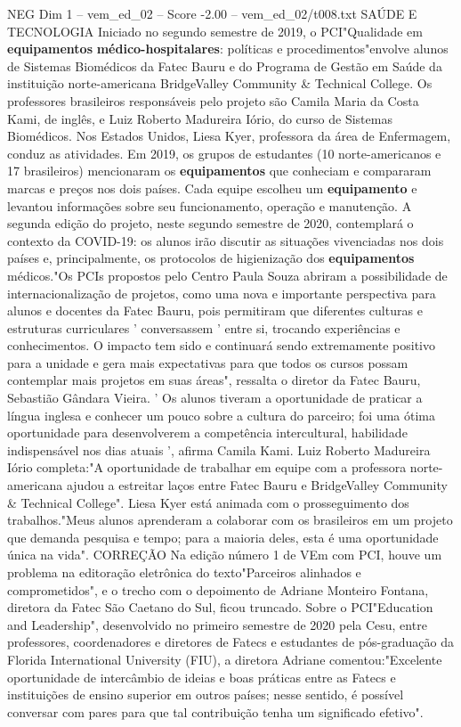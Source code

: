 \begin{textsample}{NEG Dim 1 – vem\_ed\_02 – Score -2.00 – vem\_ed\_02/t008.txt}  \label{ex:f1_neg_015}
SAÚDE E TECNOLOGIA Iniciado no segundo semestre de 2019, o PCI"Qualidade em \textbf{equipamentos} \textbf{médico-hospitalares}: políticas e procedimentos"envolve alunos de Sistemas Biomédicos da Fatec Bauru e do Programa de Gestão em Saúde da instituição norte-americana BridgeValley Community \& Technical College.
Os professores brasileiros responsáveis pelo projeto são Camila Maria da Costa Kami, de inglês, e Luiz Roberto Madureira Iório, do curso de Sistemas Biomédicos.
Nos Estados Unidos, Liesa Kyer, professora da área de Enfermagem, conduz as atividades.
Em 2019, os grupos de estudantes (10 norte-americanos e 17 brasileiros) mencionaram os \textbf{equipamentos} que conheciam e compararam marcas e preços nos dois países.
Cada equipe escolheu um \textbf{equipamento} e levantou informações sobre seu funcionamento, operação e manutenção.
A segunda edição do projeto, neste segundo semestre de 2020, contemplará o contexto da COVID-19: os alunos irão discutir as situações vivenciadas nos dois países e, principalmente, os protocolos de higienização dos \textbf{equipamentos} médicos."Os PCIs propostos pelo Centro Paula Souza abriram a possibilidade de internacionalização de projetos, como uma nova e importante perspectiva para alunos e docentes da Fatec Bauru, pois permitiram que diferentes culturas e estruturas curriculares ' conversassem ' entre si, trocando experiências e conhecimentos.
O impacto tem sido e continuará sendo extremamente positivo para a unidade e gera mais expectativas para que todos os cursos possam contemplar mais projetos em suas áreas", ressalta o diretor da Fatec Bauru, Sebastião Gândara Vieira. ' Os alunos tiveram a oportunidade de praticar a língua inglesa e conhecer um pouco sobre a cultura do parceiro; foi uma ótima oportunidade para desenvolverem a competência intercultural, habilidade indispensável nos dias atuais ', afirma Camila Kami.
Luiz Roberto Madureira Iório completa:"A oportunidade de trabalhar em equipe com a professora norte-americana ajudou a estreitar laços entre Fatec Bauru e BridgeValley Community \& Technical College".
Liesa Kyer está animada com o prosseguimento dos trabalhos."Meus alunos aprenderam a colaborar com os brasileiros em um projeto que demanda pesquisa e tempo; para a maioria deles, esta é uma oportunidade única na vida".
CORREÇÃO Na edição número 1 de VEm com PCI, houve um problema na editoração eletrônica do texto"Parceiros alinhados e comprometidos", e o trecho com o depoimento de Adriane Monteiro Fontana, diretora da Fatec São Caetano do Sul, ficou truncado.
Sobre o PCI"Education and Leadership", desenvolvido no primeiro semestre de 2020 pela Cesu, entre professores, coordenadores e diretores de Fatecs e estudantes de pós-graduação da Florida International University (FIU), a diretora Adriane comentou:"Excelente oportunidade de intercâmbio de ideias e boas práticas entre as Fatecs e instituições de ensino superior em outros países; nesse sentido, é possível conversar com pares para que tal contribuição tenha um significado efetivo".

\end{textsample}
